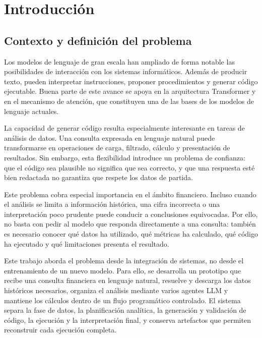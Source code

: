 \chapter{Introducci\'on}

\section{Contexto y definici\'on del problema}

Los modelos de lenguaje de gran escala han ampliado de forma notable las posibilidades de interacci\'on con los sistemas inform\'aticos. Adem\'as de producir texto,
pueden interpretar instrucciones, proponer procedimientos y generar c\'odigo ejecutable. Buena parte de este avance se apoya en la arquitectura Transformer y en
el mecanismo de atenci\'on, que constituyen una de las bases de los modelos de lenguaje actuales.

La capacidad de generar c\'odigo resulta especialmente interesante en tareas de an\'alisis de datos. Una consulta expresada en lenguaje natural puede transformarse en
operaciones de carga, filtrado, c\'alculo y presentaci\'on de resultados. Sin embargo, esta flexibilidad introduce un problema de confianza: que el c\'odigo sea 
plausible no significa que sea correcto, y que una respuesta est\'e bien redactada no garantiza que respete los datos de partida.

Este problema cobra especial importancia en el \'ambito financiero. Incluso cuando el an\'alisis se limita a informaci\'on hist\'orica, una cifra incorrecta o una
interpretaci\'on poco prudente puede conducir a conclusiones equivocadas. Por ello, no basta con pedir al modelo que responda directamente a una consulta: tambi\'en es
necesario conocer qu\'e datos ha utilizado, qu\'e m\'etricas ha calculado, qu\'e c\'odigo ha ejecutado y qu\'e limitaciones presenta el resultado.

Este trabajo aborda el problema desde la integraci\'on de sistemas, no desde el entrenamiento de un nuevo modelo. Para ello, se desarrolla un prototipo que recibe una
consulta financiera en lenguaje natural, resuelve y descarga los datos hist\'oricos necesarios, organiza el an\'alisis mediante varios agentes LLM y mantiene los
c\'alculos dentro de un flujo program\'atico controlado. El sistema separa la fase de datos, la planificaci\'on anal\'itica, la generaci\'on y validaci\'on de c\'odigo, 
la ejecuci\'on y la interpretaci\'on final, y conserva artefactos que permiten reconstruir cada ejecuci\'on completa.

